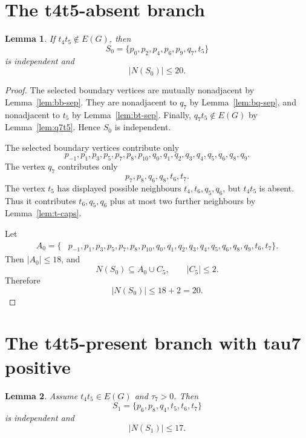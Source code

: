 \documentclass[11pt]{article}
\newtheorem{lemma}{Lemma}
\begin{document}
\section{The t4t5-absent branch}

\begin{lemma}\label{lem:S0}
If $t_4t_5\notin E(G)$, then
\[
  S_0=\{p_0,p_2,p_4,p_6,p_9,q_7,t_5\}
\]
is independent and
\[
  |N(S_0)|\le20.
\]
\end{lemma}

\begin{proof}
The selected boundary vertices are mutually nonadjacent by Lemma~\ref{lem:bb-sep}. They are nonadjacent to $q_7$ by Lemma~\ref{lem:bq-sep}, and nonadjacent to $t_5$ by Lemma~\ref{lem:bt-sep}. Finally, $q_7t_5\notin E(G)$ by Lemma~\ref{lem:q7t5}. Hence $S_0$ is independent.

The selected boundary vertices contribute only
\[
  p_{-1},p_1,p_3,p_5,p_7,p_8,p_{10},q_0,q_1,q_2,q_3,q_4,q_5,q_6,q_8,q_9.
\]
The vertex $q_7$ contributes only
\[
  p_7,p_8,q_6,q_8,t_6,t_7.
\]
The vertex $t_5$ has displayed possible neighbours $t_4,t_6,q_5,q_6$, but $t_4t_5$ is absent. Thus it contributes $t_6,q_5,q_6$ plus at most two further neighbours by Lemma~\ref{lem:t-caps}.

Let
\[
\begin{aligned}
A_0=\{&p_{-1},p_1,p_3,p_5,p_7,p_8,p_{10},q_0,q_1,q_2,q_3,q_4,q_5,q_6,q_8,q_9,t_6,t_7\}.
\end{aligned}
\]
Then $|A_0|\le18$, and
\[
  N(S_0)\subseteq A_0\cup C_5,
  \qquad |C_5|\le2.
\]
Therefore
\[
  |N(S_0)|\le18+2=20.
\]
\end{proof}

\section{The t4t5-present branch with tau7 positive}

\begin{lemma}\label{lem:S1}
Assume $t_4t_5\in E(G)$ and $\tau_7>0$. Then
\[
  S_1=\{p_6,p_8,q_4,t_5,t_6,t_7\}
\]
is independent and
\[
  |N(S_1)|\le17.
\]
\end{lemma}
\end{document}
